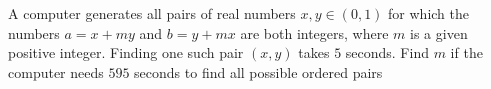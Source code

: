 A computer generates all pairs of real numbers $x, y \in (0, 1)$ for which the numbers $a = x+my$ and $b = y+mx$ are both integers, where $m$ is a given positive integer. Finding one such pair $(x, y)$ takes $5$ seconds. Find $m$ if  the computer needs $595$ seconds to find all possible ordered pairs 